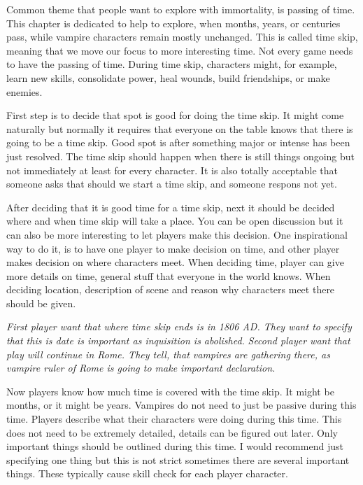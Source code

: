 Common theme that people want to explore with immortality, is passing of time.
This chapter is dedicated to help to explore, when months, years, or centuries pass, while vampire characters remain mostly unchanged. %
This is called time skip, meaning that we move our focus to more interesting time.
Not every game needs to have the passing of time.
During time skip, characters might, for example, learn new skills, consolidate power, heal wounds, build friendships, or make enemies.

First step is to decide that spot is good for doing the time skip.
It might come naturally but normally it requires that everyone on the table knows that there is going to be a time skip.
Good spot is after something major or intense has been just resolved.
The time skip should happen when there is still things ongoing but not immediately at least for every character.
It is also totally acceptable that someone asks that should we start a time skip, and someone respons not yet. %

After deciding that it is good time for a time skip, next it should be decided where and when time skip will take a place.
You can be open discussion but it can also be more interesting to let players make this decision. %
One inspirational way to do it, is to have one player to make decision on time, 
	and other player makes decision on where characters meet.
When deciding time, player can give more details on time, general stuff that everyone in the world knows.
When deciding location, description of scene and reason why characters meet there should be given.

\textit{First player want that where time skip ends is in 1806 AD. They want to specify that this is date is important as inquisition is abolished.} %
\textit{Second player want that play will continue in Rome. They tell, that vampires are gathering there, as vampire ruler of Rome is going to make important declaration.}

Now players know how much time is covered with the time skip.
It might be months, or it might be years.
Vampires do not need to just be passive during this time.
Players describe what their characters were doing during this time.
This does not need to be extremely detailed, details can be figured out later.
Only important things should be outlined during this time.
I would recommend just specifying one thing but this is not strict sometimes there are several important things.
These typically cause skill check for each player character. %

